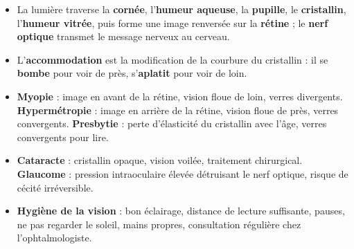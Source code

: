 \documentclass[11pt]{article}
\begin{document}
\begin{aretenir}
\begin{itemize}
\item La lumière traverse la \textbf{cornée}, l'\textbf{humeur aqueuse}, la \textbf{pupille}, le \textbf{cristallin}, l'\textbf{humeur vitrée}, puis forme une image renversée sur la \textbf{rétine} ; le \textbf{nerf optique} transmet le message nerveux au cerveau.
\item L'\textbf{accommodation} est la modification de la courbure du cristallin : il se \textbf{bombe} pour voir de près, s'\textbf{aplatit} pour voir de loin.
\item \textbf{Myopie} : image en avant de la rétine, vision floue de loin, verres divergents. \textbf{Hypermétropie} : image en arrière de la rétine, vision floue de près, verres convergents. \textbf{Presbytie} : perte d'élasticité du cristallin avec l'âge, verres convergents pour lire.
\item \textbf{Cataracte} : cristallin opaque, vision voilée, traitement chirurgical. \textbf{Glaucome} : pression intraoculaire élevée détruisant le nerf optique, risque de cécité irréversible.
\item \textbf{Hygiène de la vision} : bon éclairage, distance de lecture suffisante, pauses, ne pas regarder le soleil, mains propres, consultation régulière chez l'ophtalmologiste.
\end{itemize}
\end{aretenir}
\end{document}
